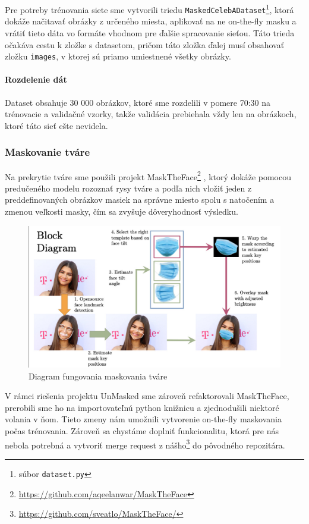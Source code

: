 \documentclass [11pt, a4paper]{article}
\begin{document}
	Pre potreby trénovania siete sme vytvorili triedu \texttt{MaskedCelebADataset}\footnote{súbor \texttt{dataset.py}}, ktorá dokáže načitavať obrázky z určeného miesta, aplikovať na ne on-the-fly masku a vrátiť tieto dáta vo formáte vhodnom pre ďalšie spracovanie sieťou. Táto trieda očakáva cestu k zložke s datasetom, pričom táto zložka ďalej musí obsahovať zložku \texttt{images}, v ktorej sú priamo umiestnené všetky obrázky.
	
	\paragraph{Rozdelenie dát} Dataset obsahuje 30 000 obrázkov, ktoré sme rozdelili v pomere 70:30 na trénovacie a validačné vzorky, takže validácia prebiehala vždy len na obrázkoch, ktoré táto sieť ešte nevidela.
	
	\subsubsection{Maskovanie tváre}
	Na prekrytie tváre sme použili projekt MaskTheFace\footnote{\url{https://github.com/aqeelanwar/MaskTheFace}} \cite{anwar2020masked}, ktorý dokáže pomocou predučeného modelu rozoznať rysy tváre a podľa nich vložiť jeden z preddefinovaných obrázkov masiek na správne miesto spolu s natočením a zmenou veľkosti masky, čím sa zvyšuje dôveryhodnosť výsledku.
	
	\begin{figure}[h]
		\centering
		\includegraphics[width=0.7\linewidth]{img/mask_the_face-diagram}
		\caption{Diagram fungovania maskovania tváre \cite{anwar2020masked}}
		\label{fig:masktheface-diagram}
	\end{figure}
	
	V rámci riešenia projektu UnMasked sme zároveň refaktorovali MaskTheFace, prerobili sme ho na importovateľnú python knižnicu a zjednodušili niektoré volania v ňom. Tieto zmeny nám umožnili vytvorenie on-the-fly maskovania počas trénovania. Zároveň sa chystáme doplniť funkcionalitu, ktorá pre nás nebola potrebná a vytvoriť merge request z nášho\footnote{\url{https://github.com/sveatlo/MaskTheFace/}} do pôvodného repozitára.
	
\end{document}
